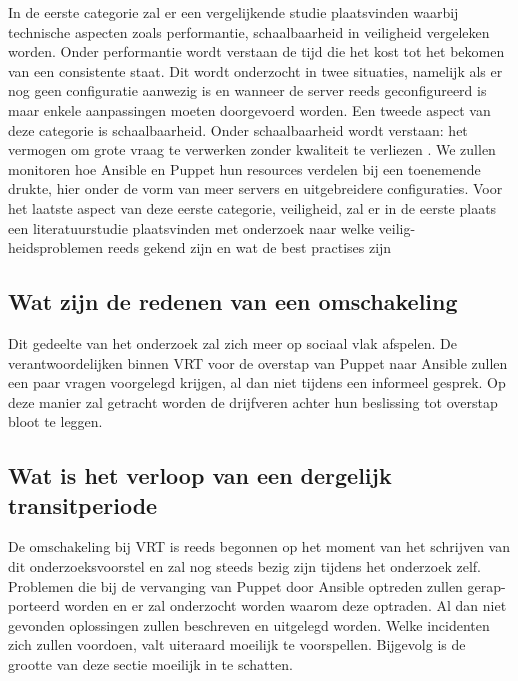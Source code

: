 In de eerste categorie zal er een vergelijkende studie plaatsvinden waarbij technische aspecten zoals performantie, schaalbaarheid in veiligheid vergeleken worden. Onder performantie wordt verstaan de tijd die het kost tot het bekomen van een consistente staat. Dit wordt onderzocht in twee situaties, namelijk als er nog geen configuratie aanwezig is en wanneer de server reeds geconfigureerd is maar enkele aanpassingen moeten doorgevoerd worden. Een tweede aspect van deze categorie is schaalbaarheid. Onder schaalbaarheid wordt verstaan: het vermogen om grote vraag te verwerken zonder kwaliteit te verliezen \autocite{informit}. We zullen monitoren hoe Ansible en Puppet hun resources verdelen bij een toenemende drukte, hier onder de vorm van meer servers en uitgebreidere configuraties. Voor het laatste aspect van deze eerste categorie, veiligheid, zal er in de eerste plaats een literatuurstudie plaatsvinden met onderzoek naar welke veilig- heidsproblemen reeds gekend zijn en wat de best practises zijn


\subsection{Wat zijn de redenen van een omschakeling}

Dit gedeelte van het onderzoek zal zich meer op sociaal vlak afspelen. De verantwoordelijken binnen VRT voor de overstap van Puppet naar Ansible zullen een paar vragen voorgelegd krijgen, al dan niet tijdens een informeel gesprek. Op deze manier zal getracht worden de drijfveren achter hun beslissing tot overstap bloot te leggen.

\subsection{Wat is het verloop van een dergelijk transitperiode}

De omschakeling bij VRT is reeds begonnen op het moment van het schrijven van dit onderzoeksvoorstel en zal nog steeds bezig zijn tijdens het onderzoek zelf. Problemen die bij de vervanging van Puppet door Ansible optreden zullen gerap- porteerd worden en er zal onderzocht worden waarom deze optraden. Al dan niet gevonden oplossingen zullen beschreven en uitgelegd worden. Welke incidenten zich zullen voordoen, valt uiteraard moeilijk te voorspellen. Bijgevolg is de grootte van deze sectie moeilijk in te schatten.




